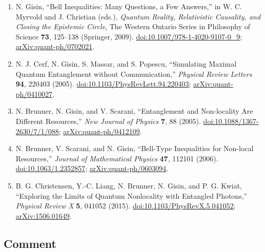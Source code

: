 \begin{enumerate}[label={},leftmargin=4.8em,labelsep=0.5em]
  \footnotesize
  \item[\textup{[Gis09]}]\label{ref:p28-gisin}
  N. Gisin, ``Bell Inequalities: Many Questions, a Few Answers,'' in
  W. C. Myrvold and J. Christian (eds.), \emph{Quantum Reality, Relativistic
  Causality, and Closing the Epistemic Circle}, The Western Ontario Series in
  Philosophy of Science \textbf{73}, 125--138 (Springer, 2009).
  \href{https://doi.org/10.1007/978-1-4020-9107-0_9}{doi:10.1007/978-1-4020-9107-0\_9};
  \href{https://arxiv.org/abs/quant-ph/0702021}{arXiv:quant-ph/0702021}.

  \item[\textup{[CGMP05]}]\label{ref:p28-cerf}
  N. J. Cerf, N. Gisin, S. Massar, and S. Popescu, ``Simulating Maximal
  Quantum Entanglement without Communication,'' \emph{Physical Review
  Letters} \textbf{94}, 220403 (2005).
  \href{https://doi.org/10.1103/PhysRevLett.94.220403}{doi:10.1103/PhysRevLett.94.220403};
  \href{https://arxiv.org/abs/quant-ph/0410027}{arXiv:quant-ph/0410027}.

  \item[\textup{[BGS05]}]\label{ref:p28-brunner-njp}
  N. Brunner, N. Gisin, and V. Scarani, ``Entanglement and Non-locality Are
  Different Resources,'' \emph{New Journal of Physics} \textbf{7}, 88
  (2005). \href{https://doi.org/10.1088/1367-2630/7/1/088}{doi:10.1088/1367-2630/7/1/088};
  \href{https://arxiv.org/abs/quant-ph/0412109}{arXiv:quant-ph/0412109}.

  \item[\textup{[BSG06]}]\label{ref:p28-brunner-jmp}
  N. Brunner, V. Scarani, and N. Gisin, ``Bell-Type Inequalities for
  Non-local Resources,'' \emph{Journal of Mathematical Physics} \textbf{47},
  112101 (2006).
  \href{https://doi.org/10.1063/1.2352857}{doi:10.1063/1.2352857};
  \href{https://arxiv.org/abs/quant-ph/0603094}{arXiv:quant-ph/0603094}.

  \item[\textup{[CLBGK15]}]\label{ref:p28-christensen}
  B. G. Christensen, Y.-C. Liang, N. Brunner, N. Gisin, and P. G. Kwiat,
  ``Exploring the Limits of Quantum Nonlocality with Entangled Photons,''
  \emph{Physical Review X} \textbf{5}, 041052 (2015).
  \href{https://doi.org/10.1103/PhysRevX.5.041052}{doi:10.1103/PhysRevX.5.041052};
  \href{https://arxiv.org/abs/1506.01649}{arXiv:1506.01649}.
\end{enumerate}

\subsection*{Comment}

